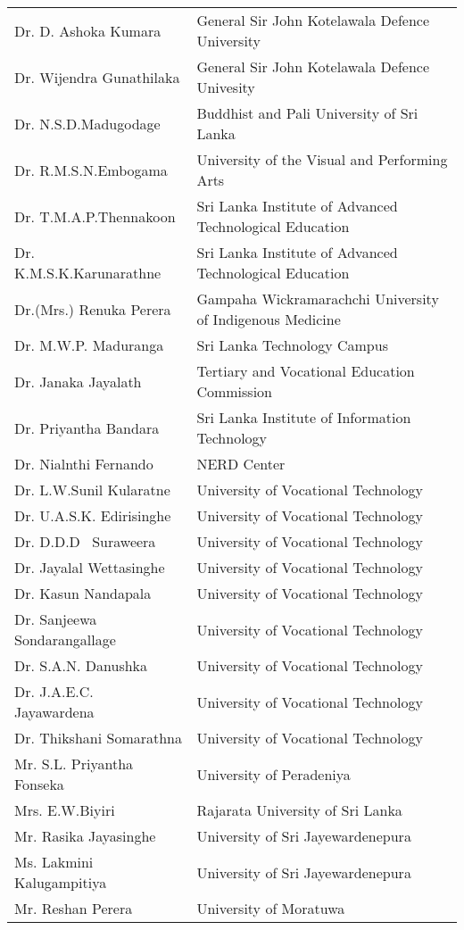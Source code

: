 \begin{longtable}{ L{4.8cm}  L{6.5cm} }
Dr. D. Ashoka Kumara & General Sir John Kotelawala Defence University\\
Dr. Wijendra Gunathilaka & General Sir John Kotelawala Defence Univesity\\
Dr. N.S.D.Madugodage & Buddhist and Pali University of Sri Lanka\\
Dr. R.M.S.N.Embogama & University of the Visual and Performing Arts\\
Dr. T.M.A.P.Thennakoon & Sri Lanka Institute of Advanced Technological Education\\
Dr. K.M.S.K.Karunarathne & Sri Lanka Institute of Advanced Technological Education\\
Dr.(Mrs.) Renuka Perera & Gampaha Wickramarachchi University of Indigenous Medicine\\
Dr. M.W.P. Maduranga & Sri Lanka Technology Campus\\
Dr. Janaka Jayalath & Tertiary and Vocational Education Commission\\
Dr. Priyantha Bandara & Sri Lanka Institute of Information Technology\\
Dr. Nialnthi Fernando & NERD Center\\
Dr. L.W.Sunil Kularatne & University of Vocational Technology\\
Dr. U.A.S.K. Edirisinghe & University of Vocational Technology\\
Dr. D.D.D  Suraweera & University of Vocational Technology\\
Dr. Jayalal Wettasinghe & University of Vocational Technology\\
Dr. Kasun Nandapala & University of Vocational Technology\\
Dr. Sanjeewa Sondarangallage & University of Vocational Technology\\
Dr. S.A.N. Danushka & University of Vocational Technology\\
Dr. J.A.E.C.  Jayawardena & University of Vocational Technology\\
Dr. Thikshani Somarathna & University of Vocational Technology\\
Mr. S.L. Priyantha Fonseka & University of Peradeniya\\
Mrs. E.W.Biyiri & Rajarata University of Sri Lanka\\
Mr. Rasika Jayasinghe & University of Sri Jayewardenepura\\
Ms. Lakmini Kalugampitiya & University of Sri Jayewardenepura\\
Mr. Reshan Perera & University of Moratuwa\\

\end{longtable}

